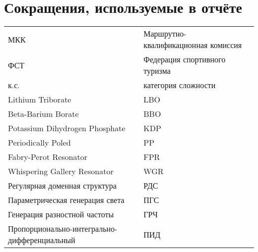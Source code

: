 \section*{Сокращения, используемые в отчёте}
\begin{tabular}{p{} p{}}
	МКК                                  &   Маршрутно-квалификационная комиссия  \\
	ФСТ                                &   Федерация спортивного туризма  \\
	к.с.                               &   категория сложности  \\
	Lithium Triborate                             &   LBO \\
	Beta-Barium Borate                            &   BBO \\
	Potassium Dihydrogen Phosphate                &   KDP  \\
	Periodically Poled                            &   PP  \\
	Fabry-Perot Resonator                         &   FPR \\
	Whispering Gallery Resonator                  &   WGR \\
	Регулярная доменная структура                 &   РДС \\
	Параметрическая генерация света               &   ПГС \\
	Генерация разностной частоты                  &   ГРЧ \\
	Пропорционально-интегрально-дифференциальный  &   ПИД \\
	
\end{tabular}